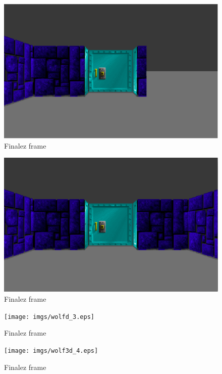 \documentclass[book.tex]{subfiles}
\begin{document}
 \begin{figure}[H]
\centering
 \includegraphics{imgs/wolfd_2_3.eps}
 \caption{Finalez frame} \label{fig:mips}
 \end{figure}

 \begin{figure}[H]
\centering
 \includegraphics{imgs/wolfd_2_5.eps}
 \caption{Finalez frame} \label{fig:mips}
 \end{figure}
 
  \begin{figure}[H]
\centering
 \texttt{[image: imgs/wolfd\_3.eps]}
 \caption{Finalez frame} \label{fig:mips}
 \end{figure}
 
   \begin{figure}[H]
\centering
 \texttt{[image: imgs/wolf3d\_4.eps]}
 \caption{Finalez frame} \label{fig:mips}
 \end{figure}
 
\end{document}
